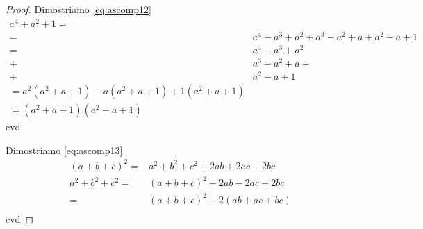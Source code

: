 \begin{proof}
Dimostriamo \ref{eq:ascomp12}
\begin{align*}
a^4+a^2+1=&\\
=&a^4-a^3+a^2+a^3-a^2+a+a^2-a+1\\
=&a^4-a^3+a^2\\
+&a^3-a^2+a+\\
+&a^2-a+1\\
=a^2(a^2+a+1)-a(a^2+a+1)+1(a^2+a+1)\\
=(a^2+a+1)(a^2-a+1)
\end{align*}
cvd

Dimostriamo \ref{eq:ascomp13}
\begin{align*}
(a+b+c)^2=&a^2+b^2+c^2+2ab+2ac+2bc\\
a^2+b^2+c^2=&(a+b+c)^2-2ab-2ac-2bc\\
=&(a+b+c)^2-2(ab+ac+bc)\\
\end{align*}
cvd
\end{proof}